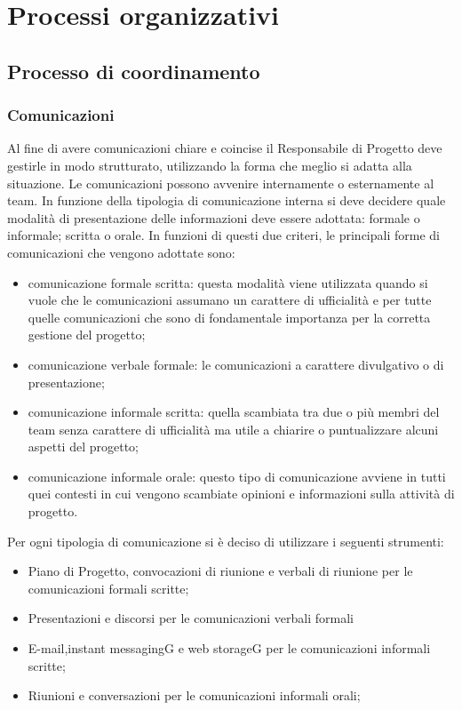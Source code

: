 
\section{Processi organizzativi}

\subsection{Processo di coordinamento}
\subsubsection{Comunicazioni}
Al fine di avere comunicazioni chiare e coincise il Responsabile di Progetto deve gestirle in modo strutturato, utilizzando la forma che meglio si adatta alla situazione.
Le comunicazioni possono avvenire internamente o esternamente al team.
In funzione della tipologia di comunicazione interna si deve decidere quale modalità di presentazione delle informazioni deve essere adottata: formale o informale; scritta o orale.
In funzioni di questi due criteri, le principali forme di comunicazioni che vengono adottate sono:
\begin{itemize}
\item
comunicazione formale scritta: questa modalità viene utilizzata quando si vuole che le comunicazioni assumano un carattere di ufficialità e per tutte quelle comunicazioni che sono di fondamentale importanza per la corretta gestione del progetto;
\item
comunicazione verbale formale: le comunicazioni a carattere divulgativo o di presentazione;
\item
comunicazione informale scritta: quella scambiata tra due o più membri del team senza carattere di ufficialità ma utile a chiarire o puntualizzare alcuni aspetti del progetto;
\item
comunicazione informale orale: questo tipo di comunicazione avviene in tutti quei contesti in cui vengono scambiate opinioni e informazioni sulla attività di progetto.
\end{itemize}

Per ogni tipologia di comunicazione si è deciso di utilizzare i seguenti strumenti:
\begin{itemize}
\item
Piano di Progetto, convocazioni di riunione e verbali di riunione per le comunicazioni formali scritte;
\item
Presentazioni e discorsi per le comunicazioni verbali formali 
\item
E-mail,instant messagingG e web storageG per le comunicazioni informali scritte;
\item
Riunioni e conversazioni per le comunicazioni informali orali; 
\end{itemize}

